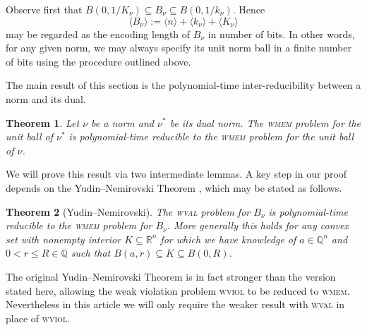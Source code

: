 \documentclass[11pt,reqno]{amsart}
\newtheorem{theorem}{Theorem}[section]
\theoremstyle{definition}
\theoremstyle{remark}
\begin{document}
Observe first that $B(0,1/K_\nu)\subseteq B_\nu\subseteq B(0,1/k_\nu)$.
Hence
\[
\langle B_\nu \rangle:=\langle n \rangle+\langle k_\nu \rangle+\langle K_\nu \rangle
\]
may be regarded as the encoding length of $B_\nu$ in number of bits. In other words, for any given norm, we may always specify its unit norm ball in a finite number of bits using the procedure outlined above.

The main result of this section is the polynomial-time inter-reducibility between a norm and its dual.
\begin{theorem}\label{polduality}  
Let $\nu$ be a norm and $\nu^*$ be its dual norm. The \textsc{wmem} problem for the unit ball of $\nu^*$  is polynomial-time reducible to
the \textsc{wmem} problem for the unit ball of $\nu$.
\end{theorem}

We will prove this result via two intermediate lemmas. 
A key step in our proof depends on the Yudin--Nemirovski Theorem \cite[Theorem~4.3.2]{GLS88}, which may be stated as follows.
\begin{theorem}[Yudin--Nemirovski]\label{thm:YN}
The \textsc{wval} problem for $B_\nu$ is polynomial-time reducible to the \textsc{wmem} problem for $B_{\nu}$. More generally this holds for any convex set with nonempty interior $K \subseteq \mathbb{R}^n$ for which we have knowledge of $a \in \mathbb{Q}^n$ and $0< r \le R \in \mathbb{Q}$ such that $B(a,r) \subseteq K \subseteq B(0,R)$.
\end{theorem}
The original Yudin--Nemirovski Theorem is in fact stronger than the version stated here, allowing the weak violation problem \textsc{wviol} to be reduced to \textsc{wmem}. Nevertheless in this article we will only require the weaker result with \textsc{wval} in place of \textsc{wviol}.
\end{document}
